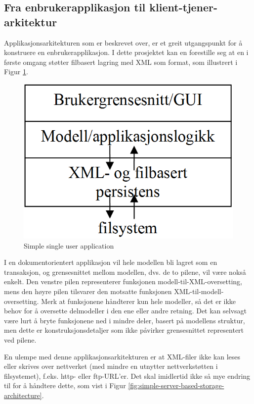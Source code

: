 \subsection{Fra enbrukerapplikasjon til klient-tjener-arkitektur}

Applikasjonsarkitekturen som er beskrevet over, er et greit utgangspunkt for å konstruere en enbrukerapplikasjon. I dette prosjektet kan en forestille seg at en i første omgang støtter filbasert lagring med XML som format, som illustrert i Figur \ref{fig:simple-single-user-application}.

\begin{figure}[H]
    \centering
    \includegraphics[scale=0.35]{resources/simple-single-user-application.PNG}
    \caption{Simple single user application}
    \label{fig:simple-single-user-application}
\end{figure}

I en dokumentorientert applikasjon vil hele modellen bli lagret som en transaksjon, og grensesnittet mellom modellen, dvs. de to pilene, vil være nokså enkelt. Den venstre pilen representerer funksjonen modell-til-XML-oversetting, mens den høyre pilen tilsvarer den motsatte funksjonen XML-til-modell-oversetting. Merk at funksjonene håndterer kun hele modeller, så det er ikke behov for å oversette delmodeller i den ene eller andre retning. Det kan selvsagt være lurt å bryte funksjonene ned i mindre deler, basert på modellens struktur, men dette er konstruksjonsdetaljer som ikke påvirker grensesnittet representert ved pilene.

En ulempe med denne applikasjonsarkitekturen er at XML-filer ikke kan leses eller skrives over nettverket (med mindre en utnytter nettverkstøtten i filsystemet), f.eks. http- eller ftp-URL’er. Det skal imidlertid ikke så mye endring til for å håndtere dette, som vist i Figur \ref{fig:simple-server-based-storage-architecture}.

